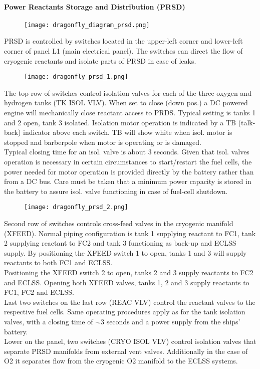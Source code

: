\documentclass[Orbiter User Manual.tex]{subfiles}
\begin{document}
\paragraph{Power Reactants Storage and Distribution (PRSD)}

\begin{figure}[H]
  \centering
  \texttt{[image: dragonfly\_diagram\_prsd.png]}
\end{figure}

\noindent
PRSD is controlled by switches located in the upper-left corner and lower-left corner of panel L1 (main electrical panel). The switches can direct the flow of cryogenic reactants and isolate parts of PRSD in case of leaks.

\begin{figure}[H]
  \centering
  \texttt{[image: dragonfly\_prsd\_1.png]}
\end{figure}

\noindent
The top row of switches control isolation valves for each of the three oxygen and hydrogen tanks (TK ISOL VLV). When set to close (down pos.) a DC powered engine will mechanically close reactant access to PRDS. Typical setting is tanks 1 and 2 open, tank 3 isolated. Isolation motor operation is indicated by a TB (talk-back) indicator above each switch. TB will show white when isol. motor is stopped and barberpole when motor is operating or is damaged.\\
Typical closing time for an isol. valve is about 3 seconds. Given that isol. valves operation is necessary in certain circumstances to start/restart the fuel cells, the power needed for motor operation is provided directly by the battery rather than from a DC bus. Care must be taken that a minimum power capacity is stored in the battery to assure isol. valve functioning in case of fuel-cell shutdown.

\begin{figure}[H]
  \centering
  \texttt{[image: dragonfly\_prsd\_2.png]}
\end{figure}

\noindent
Second row of switches controls cross-feed valves in the cryogenic manifold (XFEED). Normal piping configuration is tank 1 supplying reactant to FC1, tank 2 supplying reactant to FC2 and tank 3 functioning as back-up and ECLSS supply. By positioning the XFEED switch 1 to open, tanks 1 and 3 will supply reactants to both FC1 and ECLSS.\\
Positioning the XFEED switch 2 to open, tanks 2 and 3 supply reactants to FC2 and ECLSS. Opening both XFEED valves, tanks 1, 2 and 3 supply reactants to FC1, FC2 and ECLSS.\\
Last two switches on the last row (REAC VLV) control the reactant valves to the respective fuel cells. Same operating procedures apply as for the tank isolation valves, with a closing time of $\sim$3
seconds and a power supply from the ships' battery.\\
Lower on the panel, two switches (CRYO ISOL VLV) control isolation valves that separate PRSD manifolds from external vent valves. Additionally in the case of O2 it separates flow from the cryogenic O2 manifold to the ECLSS systems.
\end{document}
